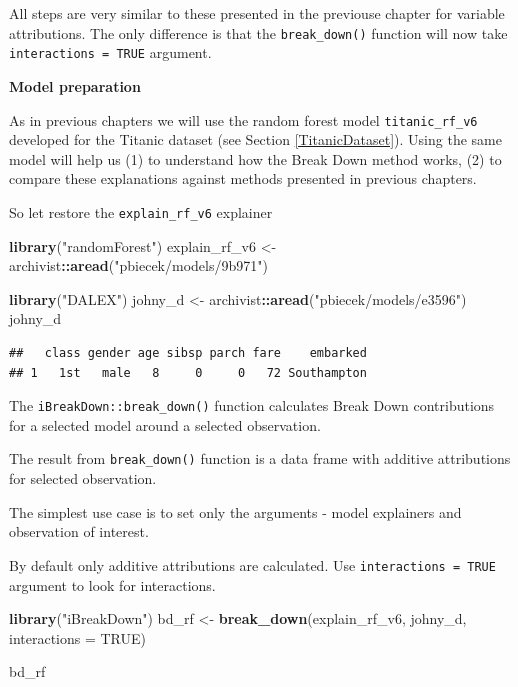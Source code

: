 \documentclass[12pt,]{krantz}
\newenvironment{Shaded}{\begin{snugshade}}{\end{snugshade}}
\newcommand{\DataTypeTok}[1]{\textcolor[rgb]{0.13,0.29,0.53}{#1}}
\newcommand{\KeywordTok}[1]{\textcolor[rgb]{0.13,0.29,0.53}{\textbf{#1}}}
\newcommand{\NormalTok}[1]{#1}
\newcommand{\OperatorTok}[1]{\textcolor[rgb]{0.81,0.36,0.00}{\textbf{#1}}}
\newcommand{\OtherTok}[1]{\textcolor[rgb]{0.56,0.35,0.01}{#1}}
\newcommand{\StringTok}[1]{\textcolor[rgb]{0.31,0.60,0.02}{#1}}
\theoremstyle{definition}
\theoremstyle{definition}
\theoremstyle{definition}
\theoremstyle{remark}
\begin{document}
All steps are very similar to these presented in the previouse chapter
for variable attributions. The only difference is that the
\texttt{break\_down()} function will now take
\texttt{interactions\ =\ TRUE} argument.

\textbf{Model preparation}

As in previous chapters we will use the random forest
\citep{R-randomForest} model \texttt{titanic\_rf\_v6} developed for the
Titanic dataset (see Section \ref{TitanicDataset}). Using the same model
will help us (1) to understand how the Break Down method works, (2) to
compare these explanations against methods presented in previous
chapters.

So let restore the \texttt{explain\_rf\_v6} explainer

\begin{Shaded}
\begin{Highlighting}[]
\KeywordTok{library}\NormalTok{(}\StringTok{"randomForest"}\NormalTok{)}
\NormalTok{explain_rf_v6 <-}\StringTok{ }\NormalTok{archivist}\OperatorTok{::}\KeywordTok{aread}\NormalTok{(}\StringTok{"pbiecek/models/9b971"}\NormalTok{)}

\KeywordTok{library}\NormalTok{(}\StringTok{"DALEX"}\NormalTok{)}
\NormalTok{johny_d <-}\StringTok{ }\NormalTok{archivist}\OperatorTok{::}\KeywordTok{aread}\NormalTok{(}\StringTok{"pbiecek/models/e3596"}\NormalTok{)}
\NormalTok{johny_d}
\end{Highlighting}
\end{Shaded}

\begin{verbatim}
##   class gender age sibsp parch fare    embarked
## 1   1st   male   8     0     0   72 Southampton
\end{verbatim}

The \texttt{iBreakDown::break\_down()} function calculates Break Down
contributions for a selected model around a selected observation.

The result from \texttt{break\_down()} function is a data frame with
additive attributions for selected observation.

The simplest use case is to set only the arguments - model explainers
and observation of interest.

By default only additive attributions are calculated. Use
\texttt{interactions\ =\ TRUE} argument to look for interactions.

\begin{Shaded}
\begin{Highlighting}[]
\KeywordTok{library}\NormalTok{(}\StringTok{"iBreakDown"}\NormalTok{)}
\NormalTok{bd_rf <-}\StringTok{ }\KeywordTok{break_down}\NormalTok{(explain_rf_v6,}
\NormalTok{                 johny_d,}
                 \DataTypeTok{interactions =} \OtherTok{TRUE}\NormalTok{)}

\NormalTok{bd_rf}
\end{Highlighting}
\end{Shaded}
\end{document}
